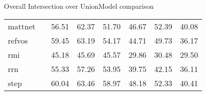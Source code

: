 \documentclass{beamer}
\begin{document}
\begin{frame}{Overall Intersection over Union}{Model comparison}
{\begin{tabular}{lc*6c}
      \acs{mattnet}   & \cite{yu18:mattn}                                            & 56.51          & 62.37          & 51.70          & 46.67          & 52.39          & 40.08          \\
      \acs{refvos}    & \cite{bellver20:refvos}                                      & 59.45          & 63.19          & 54.17          & 44.71          & 49.73          & 36.17          \\
      \acs{rmi}       & \cite{liu17:recur_multim_inter_refer_image_segmen}           & 45.18          & 45.69          & 45.57          & 29.86          & 30.48          & 29.50          \\
      \acs{rrn}       & \cite{li18:refer_image_segmen_recur_refin_networ}            & 55.33          & 57.26          & 53.95          & 39.75          & 42.15          & 36.11          \\
      \acs{step}      & \cite{chen19:see_throug_text_group_refer_image_segmen}       & 60.04          & 63.46          & 58.97          & 48.18          & 52.33          & 40.41          \\
      \bottomrule
    \end{tabular}
  }
\end{frame}
\end{document}
